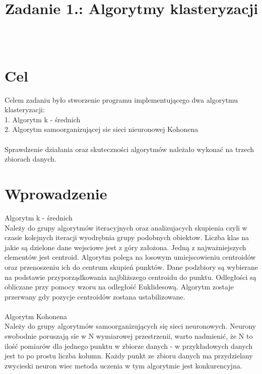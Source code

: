 \documentclass{classrep}
\author{%
  \studentinfo[216806@edu.p.lodz.pl]{Kamil Kowalewski}{216806}\\
  \studentinfo[216920@edu.p.lodz.pl]{Tomasz Witczak}{216920}%
}
\title{Zadanie 1.: Algorytmy klasteryzacji}
\begin{document}
\maketitle
\thispagestyle{fancyplain}

\section{Cel}
{Celem zadaniu było stworzenie programu implementującego dwa algorytmu klasteryzacji:\\
1. Algorytm k - średnich\\
2. Algorytm samoorganizującej sie sieci nieuronowej Kohonena\\\\
Sprawdzenie działania oraz skuteczności algorytmów należało wykonać na trzech zbiorach danych.
}

\section{Wprowadzenie}
{Algorytm k - średnich\\
Należy do grupy algorytmów iteracyjnych oraz analizujacych skupienia czyli w czasie kolejnych iteracji wyodrębnia grupy podobnych obiektow. Liczba klas na jakie są dzielone dane wejsciowe jest z góry założona. Jedną z najważniejszych elementów jest centroid. Algorytm polega na losowym umiejscowieniu centroidów oraz przenoszeniu ich do centrum skupień punktów. Dane podzbiory są wybierane na podstawie przyporządkowania najbliższego centroidu do punktu. Odległości są obliczane przy pomocy wzoru na odległość Euklidesową. Algorytm zostaje przerwany gdy pozycje centroidów zostana ustabilizowane.\\\\

Algorytm Kohonena\\
Należy do grupy algorytmów samoorganizujących się sieci neuronowych. Neurony swobodnie poruszają sie w N wymiarowej przestrzenii, warto nadmienić, że N to ilość pomiarów dla jednego punktu w zbiorze danych - w przykładowych danych jest to po prostu liczba kolumn. Każdy punkt ze zbioru danych ma przydzielany zwycieski neuron wiec metoda uczenia w tym algorytmie jest konkurencyjna. 

}
\end{document}

